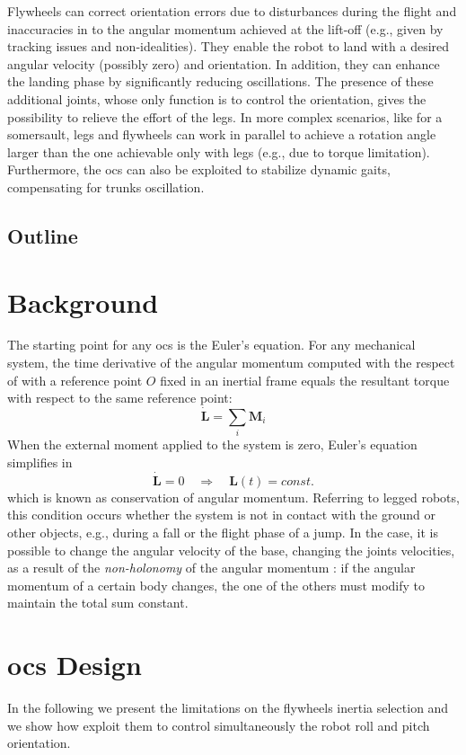 \documentclass[journal,letterpaper]{IEEEtran}
\begin{document}
Flywheels can correct orientation errors due to disturbances during the flight and inaccuracies in to the angular momentum achieved at the lift-off (e.g., given by tracking issues and non-idealities). 
They enable the robot to land with a desired angular velocity (possibly zero) and orientation.
In addition, they can enhance the landing phase by significantly reducing oscillations.  
The presence of these additional joints, whose only function is to control the orientation, gives the possibility to relieve the effort of the legs.
In more complex scenarios, like for a somersault, legs and flywheels can work in parallel to achieve a rotation angle larger than the one achievable only with legs (e.g., due to torque limitation). Furthermore, the \acrshort{ocs} can also be exploited to stabilize dynamic gaits, compensating for trunks oscillation.

\subsection{Outline}
\lipsum[1]
% 

\section{Background}
The starting point for any \acrshort{ocs} is the Euler's equation. For any mechanical system, the time derivative of the angular momentum computed with the respect of with a reference point $O$ fixed in an inertial frame equals
the resultant torque with respect to the same reference point:
\begin{equation}
	\dot{\bm{L}} = \sum_i \bm{M}_i
\end{equation}
When the external moment applied to the system is zero, Euler’s equation simplifies in
\begin{equation}
\dot{\bm{L}} = 0 \quad \Rightarrow \quad \bm{L}(t) = const.
\end{equation}
which is known as conservation of angular momentum.
Referring to legged robots, this condition occurs whether the system is not in contact with the ground or other objects, e.g., during a fall or the flight phase of a jump.
In the case, it is possible to change the angular velocity of the base, changing the joints velocities, as a result of the \textit{non-holonomy} of the angular momentum \cite{Wieber16}: if the angular momentum of a certain body changes, the one of the others must modify to maintain the total sum constant.

\section{\acrshort{ocs} Design}
In the following we present the limitations on the flywheels inertia selection and we show how exploit them to control simultaneously the robot roll and pitch orientation.
\end{document}
